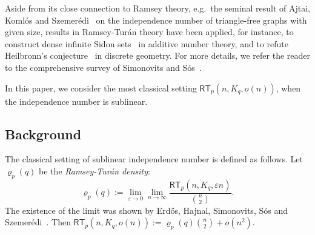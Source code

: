 \documentclass[10pt,a4paper]{article}
\theoremstyle{definition}
\def\eps{{\varepsilon}}
\newcommand{\rt}{{\mathsf{RT}}}
\begin{document}
 

 Aside from its close connection to Ramsey theory, e.g.~the seminal result of Ajtai, Koml\'os and Szemer\'edi~\cite{AKSz} on the independence number of triangle-free graphs with given size, results in Ramsey-Tur\'an theory have been applied, for instance, to construct dense infinite Sidon sets~\cite{AKSz-Sidon} in additive number theory, and to refute Heilbronn's conjecture~\cite{KPSz} in discrete geometry. For more details, we refer the reader to the comprehensive survey of Simonovits and S\'os~\cite{SimSos}.

In this paper, we consider the most classical setting $\rt_p(n,K_q,o(n))$, when the independence number is sublinear. 


\subsection{Background}
The classical setting of sublinear independence number is defined as follows. Let $\varrho_p(q)$ be the \emph{Ramsey-Tur\'an density}: 
$$
\varrho_p(q) := \lim_{\eps\rightarrow 0}\lim_{n\rightarrow \infty}\frac{\rt_p(n,K_q,\eps n)}{\binom{n}{2}}.
$$
The existence of the limit was shown by Erd\H{o}s, Hajnal, Simonovits, S\'os and Szemer\'edi~\cite{EHSSSz}. Then $\rt_p(n,K_q,o(n)):=\varrho_p(q){n\choose 2}+o(n^2)$.
\end{document}
